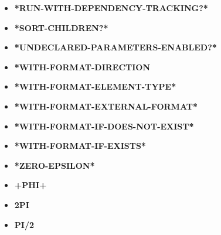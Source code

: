\documentclass [11pt]{book}
\begin{document}
\begin{itemize}
\item {}
\label{prim:*run-with-dependency-tracking?*}
\textbf{*RUN-WITH-DEPENDENCY-TRACKING?*}





\item {}
\label{prim:*sort-children?*}
\textbf{*SORT-CHILDREN?*}





\item {}
\label{prim:*undeclared-parameters-enabled?*}
\textbf{*UNDECLARED-PARAMETERS-ENABLED?*}





\item {}
\label{prim:*with-format-direction}
\textbf{*WITH-FORMAT-DIRECTION}





\item {}
\label{prim:*with-format-element-type*}
\textbf{*WITH-FORMAT-ELEMENT-TYPE*}





\item {}
\label{prim:*with-format-external-format*}
\textbf{*WITH-FORMAT-EXTERNAL-FORMAT*}





\item {}
\label{prim:*with-format-if-does-not-exist*}
\textbf{*WITH-FORMAT-IF-DOES-NOT-EXIST*}





\item {}
\label{prim:*with-format-if-exists*}
\textbf{*WITH-FORMAT-IF-EXISTS*}





\item {}
\label{prim:*zero-epsilon*}
\textbf{*ZERO-EPSILON*}





\item {}
\label{prim:+phi+}
\textbf{+PHI+}





\item {}
\label{prim:2pi}
\textbf{2PI}





\item {}
\label{prim:pi/2}
\textbf{PI/2}





\end{itemize}
\end{document}
